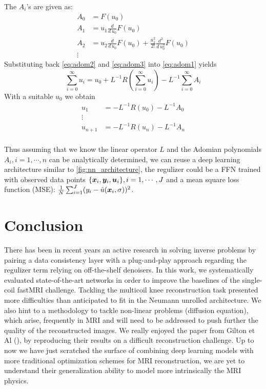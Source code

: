 \documentclass{article}
\begin{document}
The $A_i$'s are given as:
\begin{align*}
	A_0	&=	F(u_0) \\
	A_1	&=	u_1 \frac{d}{d \, u_0} F(u_0) \\
	A_2	&=	u_2 \frac{d}{d \, u_0} F(u_0) + \frac{u_1^2}{2!}  \frac{d^2}{d \, u_0^2} F(u_0)  \\
	\vdots
\end{align*}
Substituting back \eqref{eq:adom2} and \eqref{eq:adom3} into \eqref{eq:adom1} yields
\begin{equation}
	 \sum_{i=0}^\infty u_i  =  u_0  + L^{-1} R( \sum_{i=0}^\infty u_i) -   L^{-1}    \sum_{i=0}^\infty  A_i \label{eq:adom4}
\end{equation}	
With a suitable $u_0$ we obtain
\begin{align*}
	u_1 			&=	-L^{-1} R(u_0) - L^{-1} A_0 \\
	\vdots \\
	u_{n+1} 		&=  -L^{-1} R(u_n) - L^{-1} A_n \\
\end{align*}

Thus assuming that we know the linear operator $L$ and  the Adomian polynomials $A_i, i=1,\cdots,n$ can be analytically determined, we can reuse a deep learning architecture similar to \ref{fig:nn_architecture}, the regulizer could be a FFN trained with observed data points $\{\bm{x}_i, \bm{y}_i, \bm{u}_i\}, i=1,\cdots,J$ and a mean square loss function (MSE): $\frac{1}{N} \sum_{i=1}^J (y_i - \hat{u}(\bm{x}_i, \sigma))^2$. 

\section{Conclusion}
There has been in recent years an active research in solving inverse problems by pairing a data consistency layer with a plug-and-play approach regarding the regulizer term relying on off-the-shelf denoisers. In this work, we systematically evaluated state-of-the-art networks in order to improve the baselines of the single-coil fastMRI challenge. Tackling the multicoil knee reconstruction task presented more difficulties than anticipated to fit in the Neumann unrolled architecture. We also hint to a methodology to tackle non-linear problems (diffusion equation), which arise, frequently in MRI and will need to be addressed  to push further the quality of the reconstructed images. We really enjoyed the paper from Gilton et Al (\cite{DBLP:journals/corr/abs-1901-03707}), by reproducing their results on a difficult reconstruction challenge. Up to now we have just scratched the surface of combining deep learning models with more traditional optimization schemes for MRI reconstruction, we are yet to understand their generalization ability to model more intrinsically the MRI physics.
\end{document}
